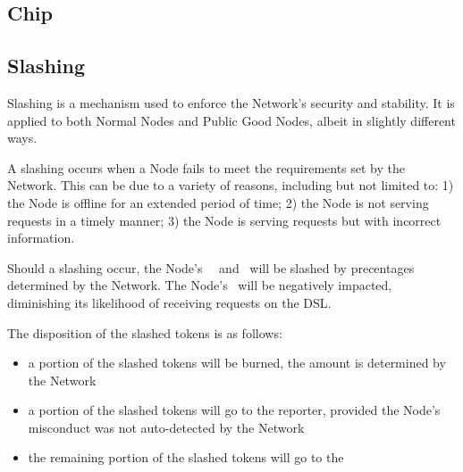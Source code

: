 \subsection{Chip}

\subsection{Slashing}

Slashing is a mechanism used to enforce the Network's security and stability. It is applied to both Normal Nodes and Public Good Nodes, albeit in slightly different ways.

A slashing occurs when a Node fails to meet the requirements set by the Network. This can be due to a variety of reasons, including but not limited to: 1) the Node is offline for an extended period of time; 2) the Node is not serving requests in a timely manner; 3) the Node is serving requests but with incorrect information.

Should a slashing occur, the Node's \deposit\, \stakingPool\, and \networkReward\ will be slashed by precentages determined by the Network.
The Node's \reliabilityScore\ will be negatively impacted, diminishing its likelihood of receiving requests on the \gls{DSL}.

The disposition of the slashed tokens is as follows:
\begin{itemize}
    \item a portion of the slashed tokens will be burned, the amount is determined by the Network
    \item a portion of the slashed tokens will go to the reporter, provided the Node’s misconduct was not auto-detected by the Network
    \item the remaining portion of the slashed tokens will go to the \publicGoodPool
\end{itemize}

